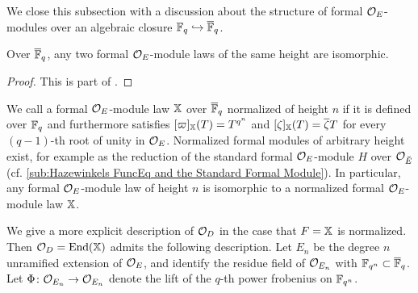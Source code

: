 \documentclass[../main.tex]{subfiles}
\begin{document}
We close this subsection with a discussion about the structure of 
formal $\mathcal{O}_E$-modules over an algebraic closure $\mathbb{F}_q \hookrightarrow {\overline{\mathbb{F}}_q}$. 

\begin{prop}\label{prop:classificationofmodulelawsbyheight}
  Over ${\overline {\mathbb{F}}_q}$, any two formal $\mathcal{O}_E$-module laws of the same
  height are isomorphic.
\begin{proof}
  This is part of \cite[Proposition 1.7]{drinfel1974elliptic}.
\end{proof}
\end{prop}



We call a formal $\mathcal{O}_E$-module law $\mathbb{X}$ over ${\overline {\mathbb{F}}_q}$ normalized of height
$n$ if it is defined over $\mathbb{F}_q$ and furthermore
satisfies $[\varpi]_{\mathbb{X}}(T) = T^{q^n}$ and $[\zeta]_{\mathbb{X}}(T) = \overline \zeta T$
for every $(q-1)$-th root of unity in $\mathcal{O}_E$.
Normalized formal modules of arbitrary height exist, for example as the
reduction of the standard formal $\mathcal{O}_E$-module $H$ over $\mathcal{O}_{\breve {E}}$ (cf.
\cref{sub:Hazewinkels FuncEq and the Standard Formal Module}).
In particular, any formal $\mathcal{O}_E$-module law of height $n$ is isomorphic to 
a normalized formal $\mathcal{O}_E$-module law $\mathbb{X}$.

We give a more explicit description of $\mathcal{O}_D$ in the case that $F = \mathbb{X}$ 
is normalized. 
Then $\mathcal{O}_D = \operatorname{End}(\mathbb{X})$ admits the following description. Let 
$E_n$ be the degree $n$ unramified extension of $\mathcal{O}_E$, and identify
the residue field of $\mathcal{O}_{E_n}$ with $\mathbb{F}_{q^n} \subset {\overline{\mathbb{F}}_q}$. Let 
$\Phi\colon \mathcal{O}_{E_n} \to \mathcal{O}_{E_n}$ denote the lift of the 
$q$-th power frobenius on $\mathbb{F}_{q^n}$. 
\end{document}
